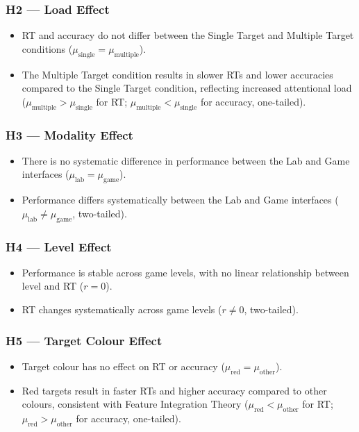 \documentclass[12pt]{article}
\begin{document}
\subsubsection*{H2 --- Load Effect}
\begin{itemize}
  \item[$H_0$:] RT and accuracy do not differ between the Single Target and Multiple Target conditions ($\mu_{\text{single}} = \mu_{\text{multiple}}$).
  \item[$H_1$:] The Multiple Target condition results in slower RTs and lower accuracies compared to the Single Target condition, reflecting increased attentional load ($\mu_{\text{multiple}} > \mu_{\text{single}}$ for RT; $\mu_{\text{multiple}} < \mu_{\text{single}}$ for accuracy, one-tailed).
\end{itemize}

\subsubsection*{H3 --- Modality Effect}
\begin{itemize}
  \item[$H_0$:] There is no systematic difference in performance between the Lab and Game interfaces ($\mu_{\text{lab}} = \mu_{\text{game}}$).
  \item[$H_1$:] Performance differs systematically between the Lab and Game interfaces ($\mu_{\text{lab}} \neq \mu_{\text{game}}$, two-tailed).
\end{itemize}

\subsubsection*{H4 --- Level Effect}
\begin{itemize}
  \item[$H_0$:] Performance is stable across game levels, with no linear relationship between level and RT ($r = 0$).
  \item[$H_1$:] RT changes systematically across game levels ($r \neq 0$, two-tailed).
\end{itemize}

\subsubsection*{H5 --- Target Colour Effect}
\begin{itemize}
  \item[$H_0$:] Target colour has no effect on RT or accuracy ($\mu_{\text{red}} = \mu_{\text{other}}$).
  \item[$H_1$:] Red targets result in faster RTs and higher accuracy compared to other colours, consistent with Feature Integration Theory \citep{treisman1980feature} ($\mu_{\text{red}} < \mu_{\text{other}}$ for RT; $\mu_{\text{red}} > \mu_{\text{other}}$ for accuracy, one-tailed).
\end{itemize}
\end{document}
